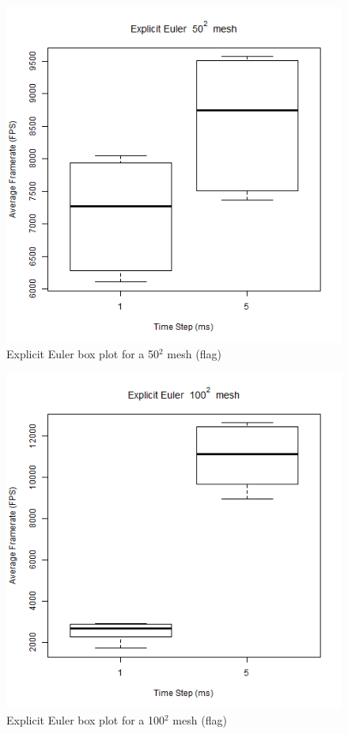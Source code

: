     \begin{figure}
    \begin{center}
      \includegraphics[scale=.9]{Figures/flag_ee_50_box}
    \end{center}
    \caption{Explicit Euler box plot for a 50$^{2}$ mesh (flag)}
    \label{fig:ee box 50 flag}
  \end{figure}
  
      \begin{figure}
    \begin{center}
      \includegraphics[scale=.9]{Figures/flag_ee_100_box}
    \end{center}
    \caption{Explicit Euler box plot for a 100$^{2}$ mesh (flag)}
    \label{fig:ee box 100 flag}
  \end{figure}
  
